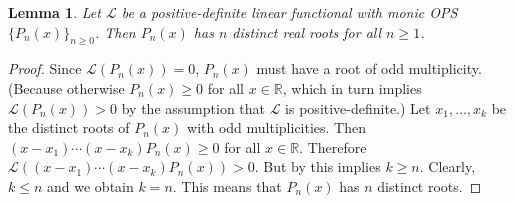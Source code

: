 \documentclass[oneside]{book}
\numberwithin{equation}{section}
\newtheorem{lem}[thm]{Lemma}
\theoremstyle{definition}
\newcommand{\RR}{\mathbb{R}}
\newcommand\LL{\mathcal{L}}
\begin{document}
\begin{lem}\label{lem:real-roots}
  Let \( \LL \) be a positive-definite linear functional with monic
  OPS \( \{ P_n(x) \}_{n\ge 0} \). Then \( P_n(x) \) has \( n \)
  distinct real roots for all \( n\ge1 \).
\end{lem}

\begin{proof}
  Since \( \LL(P_n(x)) = 0 \), \( P_n(x) \) must have a root of odd
  multiplicity. (Because otherwise \( P_n(x)\ge0 \) for all
  \( x\in\RR \), which in turn implies \( \LL(P_n(x))>0 \) by the
  assumption that \( \LL \) is positive-definite.) Let
  \( x_1,\dots,x_k \) be the distinct roots of \( P_n(x) \) with odd
  multiplicities. Then \( (x-x_1) \cdots (x-x_k)P_n(x)\ge0 \) for all
  \( x\in \RR \). Therefore
  \( \LL((x-x_1) \cdots (x-x_k)P_n(x)) > 0 \). But by
   this implies \( k\ge n \). Clearly,
  \( k\le n \) and we obtain \( k=n \). This means that \( P_n(x) \)
  has \( n \) distinct roots.
\end{proof}
\end{document}
